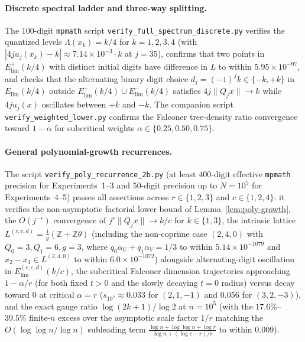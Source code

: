 \documentclass[11pt]{article}
\theoremstyle{definition}
\theoremstyle{remark}
\newcommand{\Z}{\mathbb{Z}}
\newcommand{\Lam}{\Lambda}
\begin{document}
\paragraph{Discrete spectral ladder and three-way splitting.} The 100-digit
\texttt{mpmath} script \texttt{verify\_\allowbreak full\_\allowbreak spectrum\_\allowbreak discrete.py} verifies
the quantized levels $\Lam(x_k)=k/4$ for $k=1,2,3,4$ (with $|4ju_j(x_k)-k|\approx7.14\times10^{-3}\cdot k$ at $j=35$), confirms that two points in
$E_{\mathrm{lim}}^+(k/4)$ with distinct initial digits have difference in $L$ to
within $5.95\times10^{-97}$, and checks that the alternating binary digit choice
$d_j=(-1)^j k\in\{-k,+k\}$ in $E_{\mathrm{lim}}(k/4)$ outside $E_{\mathrm{lim}}^+(k/4)\cup E_{\mathrm{lim}}^-(k/4)$ satisfies $4j\|Q_jx\|\to k$ while $4ju_j(x)$ oscillates
between $+k$ and $-k$. The companion script \texttt{verify\_\allowbreak weighted\_\allowbreak lower.py}
confirms the Falconer tree-density ratio convergence toward $1-\alpha$ for
subcritical weights $\alpha\in\{0.25,0.50,0.75\}$.

\paragraph{General polynomial-growth recurrences.} The script
\texttt{verify\_\allowbreak poly\_\allowbreak recurrence\_\allowbreak 2b.py}
(at least $400$-digit effective \texttt{mpmath} precision for Experiments~1--3
and $50$-digit precision up to $N=10^5$ for Experiments~4--5) passes all
assertions across $r\in\{1,2,3\}$ and $c\in\{1,2,4\}$: it verifies the
non-asymptotic factorial lower bound of Lemma~\ref{lem:poly-growth}, the
$O(j^{-r})$ convergence of $j^r\|Q_jx\|\to k/c$ for $k\in\{1,3\}$, the
intrinsic lattice $L^{(r,c,d)}=\frac{1}{g}(\Z+\Z\theta)$ (including the
non-coprime case $(2,4,0)$ with $Q_0=3,Q_1=6,g=3$, where
$q_0\alpha_U+q_1\alpha_V=1/3$ to within $5.14\times10^{-1079}$ and $x_2-x_1\in
L^{(2,4,0)}$ to within $6.0\times10^{-1072}$) alongside alternating-digit
oscillation in $E_{\mathrm{lim}}^{(r,c,d)}(k/c)$, the subcritical Falconer
dimension trajectories approaching $1-\alpha/r$ (for both fixed $t>0$ and the
slowly decaying $t=0$ radius) versus decay toward $0$ at critical $\alpha=r$
($s_{10^5}\approx0.033$ for $(2,1,-1)$ and $0.056$ for $(3,2,-3)$), and the
exact gauge ratio $\log(2k+1)/\log2$ at $n=10^5$ (with the $17.6\%$--$39.5\%$
finite-$n$ excess over the asymptotic scale factor $1/r$ matching the
$O(\log\log n/\log n)$ subleading term $\frac{\log n+\log\log n+\log r}{\log n+(\log c-r)/r}$
to within $0.009$).
\end{document}
